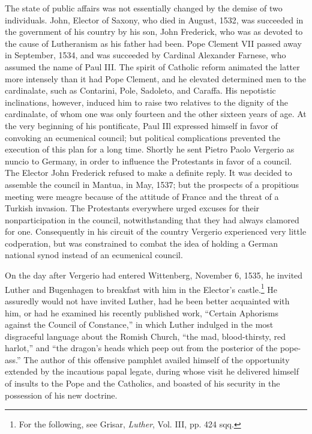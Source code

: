 The state of public affairs was not essentially changed by the demise
of two individuals. John, Elector of Saxony, who died in August,
1532, was succeeded in the government of his country by his son,
John Frederick, who was as devoted to the cause of Lutheranism as
his father had been. Pope Clement VII passed away in September,
1534, and was succeeded by Cardinal Alexander Farnese, who assumed
the name of Paul III. The spirit of Catholic reform animated the latter
more intensely than it had Pope Clement, and he elevated determined
men to the cardinalate, such as Contarini, Pole, Sadoleto, and Caraffa.
His nepotistic inclinations, however, induced him to raise two relatives
to the dignity of the cardinalate, of whom one was only fourteen
and the other sixteen years of age. At the very beginning of his
pontificate, Paul IIl expressed himself in favor of convoking an
ecumenical council; but political complications prevented the execution
of this plan for a long time. Shortly he sent Pietro Paolo
Vergerio as nuncio to Germany, in order to influence the Protestants
in favor of a council. The Elector John Frederick refused to make
a definite reply. It was decided to assemble the council in Mantua,
in May, 1537; but the prospects of a propitious meeting were meagre
because of the attitude of France and the threat of a Turkish invasion.
The Protestants everywhere urged excuses for their nonparticipation
in the council, notwithstanding that they had always
clamored for one. Consequently in his circuit of the country Vergerio
experienced very little codperation, but was constrained to combat
the idea of holding a German national synod instead of an ecumenical
council.

On the day after Vergerio had entered Wittenberg, November 6,
1535, he invited Luther and Bugenhagen to breakfast with him in
the Elector’s castle.\footnote{For the following, see Grisar, \textit{Luther}, Vol. III, pp. 424 sqq.}
He assuredly would not have invited Luther,
had he been better acquainted with him, or had he examined his
recently published work, “Certain Aphorisms against the Council of
Constance,” in which Luther indulged in the most disgraceful language
about the Romish Church, “the mad, blood-thirsty, red harlot,”
and “the dragon’s heads which peep out from the posterior of the
pope-ass.” The author of this offensive pamphlet availed himself of
the opportunity extended by the incautious papal legate, during
whose visit he delivered himself of insults to the Pope and the
Catholics, and boasted of his security in the possession of his new
doctrine.

